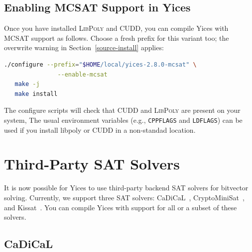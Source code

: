 \documentclass[11pt,twoside,fleqn,openright,titlepage]{cslreport}
\begin{document}
\subsection*{Enabling MCSAT Support in Yices}
Once you have installed \textsc{LibPoly} and CUDD, you can compile Yices with MCSAT
support as follows. Choose a fresh prefix for this variant too; the overwrite
warning in Section~\ref{source-install} applies:
\begin{small}
\begin{lstlisting}[language=sh]
   ./configure --prefix="$HOME/local/yices-2.8.0-mcsat" \
               --enable-mcsat
   make -j
   make install
\end{lstlisting}
\end{small}
The configure scripts will check that CUDD and \textsc{LibPoly} are present on your system,
The usual environment variables (e.g., \texttt{CPPFLAGS} and
\texttt{LDFLAGS}) can be used if you install libpoly or CUDD in a non-standad
location.

\section{Third-Party SAT Solvers}

It is now possible for Yices to use third-party backend SAT solvers
for bitvector solving. Currently, we support three SAT solvers:
CaDiCaL~\cite{Biere:cadical:2019},
CryptoMiniSat~\cite{Soos+etal:extending:2009}, and
Kissat~\cite{BiereFazekasFleuryHeisinger-SAT-Competition-2020-solvers}.
You can compile Yices with support for all or a subset of these
solvers.

\subsection*{CaDiCaL}
\end{document}
